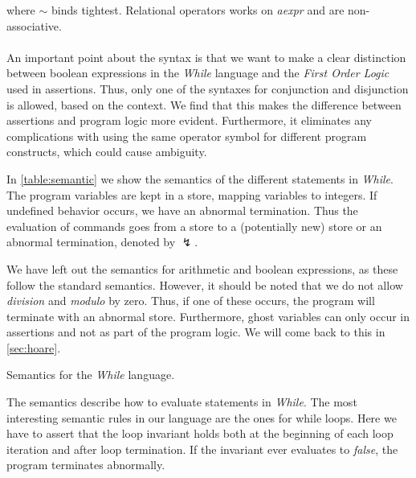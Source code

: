 where $\sim$ binds tightest.
Relational operators works on \textit{aexpr} and are non-associative.
\\~\\
An important point about the syntax is that we want to make a clear distinction between boolean expressions in the \textit{While} language and the \textit{First Order Logic} used in assertions. 
Thus, only one of the syntaxes for conjunction and disjunction is allowed, based on the context.
We find that this makes the difference between assertions and program logic more evident.
Furthermore, it eliminates any complications with using the same operator symbol for different program constructs, which could cause ambiguity.

In \cref{table:semantic} we show the semantics of the different statements in \textit{While}.
The program variables are kept in a store, mapping variables to integers.
If undefined behavior occurs, we have an abnormal termination.
Thus the evaluation of commands goes from a store to a (potentially new) store or an abnormal termination, denoted by $\lightning$.

We have left out the semantics for arithmetic and boolean expressions, as these follow the standard semantics.
However, it should be noted that we do not allow \textit{division} and \textit{modulo} by zero.
Thus, if one of these occurs, the program will terminate with an abnormal store.
Furthermore, ghost variables can only occur in assertions and not as part of the program logic. We will come back to this in \cref{sec:hoare}.

\begin{table}[h!]
\centering

\caption{Semantics for the \textit{While} language.}
\label{table:semantic}
\end{table}

The semantics describe how to evaluate statements in \textit{While}. The most interesting semantic rules in our language are the ones for while loops.
Here we have to assert that the loop invariant holds both at the beginning of each loop iteration and after loop termination.
If the invariant ever evaluates to \textit{false}, the program terminates abnormally.

